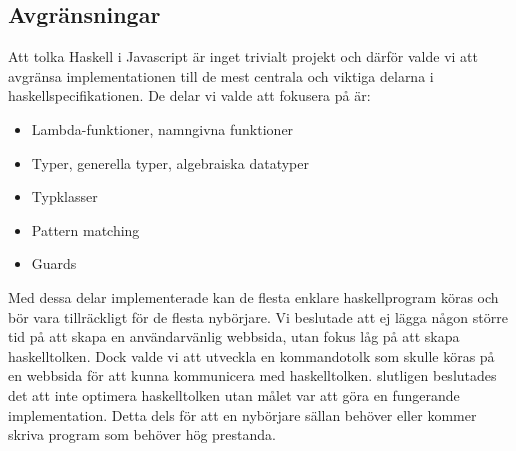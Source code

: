 \subsection{Avgränsningar} 
Att tolka Haskell i Javascript är inget trivialt projekt och därför valde vi att avgränsa implementationen till de mest centrala och viktiga delarna i haskellspecifikationen. De delar vi valde att fokusera på är:
        \begin{itemize}
            \item{Lambda-funktioner, namngivna funktioner}
            \item{Typer, generella typer, algebraiska datatyper}
            \item{Typklasser}
            \item{Pattern matching}
            \item{Guards}
        \end{itemize}
Med dessa delar implementerade kan de flesta enklare haskellprogram köras och bör vara tillräckligt för de flesta nybörjare. Vi beslutade att ej lägga någon större tid på att skapa en användarvänlig webbsida, utan fokus låg på att skapa haskelltolken. Dock valde vi att utveckla en kommandotolk som skulle köras på en webbsida för att kunna kommunicera med haskelltolken. 
slutligen beslutades det att inte optimera haskelltolken utan målet var att göra en fungerande implementation. Detta dels för att en nybörjare sällan behöver eller kommer skriva program som behöver hög prestanda.

